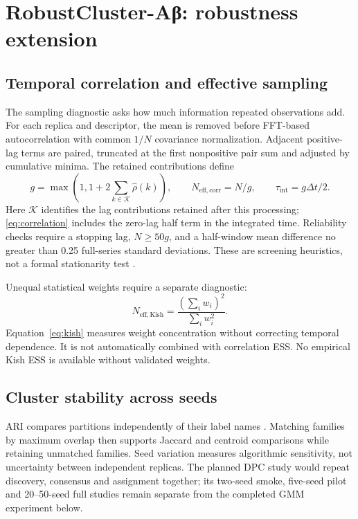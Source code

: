 \chapter{RobustCluster-Aβ: robustness extension}
\label{ch:robustness}
\section{Temporal correlation and effective sampling}
The sampling diagnostic asks how much information repeated observations add. For each replica and descriptor, the mean is removed before FFT-based autocorrelation with common $1/N$ covariance normalization. Adjacent positive-lag terms are paired, truncated at the first nonpositive pair sum and adjusted by cumulative minima. The retained contributions define
\begin{equation}
g=\max\!\left(1,1+2\sum_{k\in\mathcal K}\widehat\rho(k)\right),\qquad
N_{\mathrm{eff,corr}}=N/g,\qquad \tau_{\mathrm{int}}=g\Delta t/2.
\label{eq:correlation}
\end{equation}
Here $\mathcal K$ identifies the lag contributions retained after this processing; \cref{eq:correlation} includes the zero-lag half term in the integrated time. Reliability checks require a stopping lag, $N\geq50g$, and a half-window mean difference no greater than 0.25 full-series standard deviations. These are screening heuristics, not a formal stationarity test \autocite{grossfield2019,chodera2016}.

Unequal statistical weights require a separate diagnostic:
\begin{equation}
N_{\mathrm{eff,Kish}}=\frac{(\sum_i w_i)^2}{\sum_i w_i^2}.
\label{eq:kish}
\end{equation}
Equation~\ref{eq:kish} measures weight concentration without correcting temporal dependence. It is not automatically combined with correlation ESS. No empirical Kish ESS is available without validated weights.

\section{Cluster stability across seeds}
ARI compares partitions independently of their label names \autocite{hubert1985}. Matching families by maximum overlap then supports Jaccard and centroid comparisons while retaining unmatched families. Seed variation measures algorithmic sensitivity, not uncertainty between independent replicas. The planned DPC study would repeat discovery, consensus and assignment together; its two-seed smoke, five-seed pilot and 20--50-seed full studies remain separate from the completed GMM experiment below.

